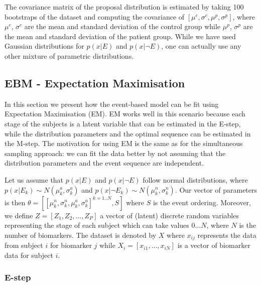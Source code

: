 The covariance matrix of the proposal distribution is estimated by taking 100 bootstraps of the dataset and computing the covariance of $[\mu^c, \sigma^c, \mu^p, \sigma^p]$, where $\mu^c$, $\sigma^c$ are the mean and standard deviation of the control group while $\mu^p$, $\sigma^p$ are the mean and standard deviation of the patient group. While we have used Gaussian distributions for $p(x|E)$ and $p(x|\neg E)$, one can actually use any other mixture of parametric distributions.


\subsection{EBM - Expectation Maximisation}
\label{sec:ebmEM}

\newcommand\independent{\protect\mathpalette{\protect\independenT}{\perp}}
\def\independenT#1#2{\mathrel{\rlap{$#1#2$}\mkern2mu{#1#2}}}

In this section we present how the event-based model can be fit using Expectation Maximisation (EM). EM works well in this scenario because each stage of the subjects is a latent variable that can be estimated in the E-step, while the distribution parameters and the optimal sequence can be estimated in the M-step. The motivation for using EM is the same as for the simultaneous sampling approach: we can fit the data better by not assuming that the distribution parameters and the event sequence are independent.

Let us assume that $p(x|E)$ and $p(x|\neg E)$ follow normal distributions, where $p(x|E_k) \sim N(\mu^a_k, \sigma^a_k)$ and $p(x|\neg E_k) \sim N(\mu^n_k, \sigma^n_k)$. Our vector of parameters is then $\theta = [[\mu_k^n, \sigma_k^n, \mu_k^a, \sigma_k^a]^{k=1..N}, S ]$ where $S$ is the event ordering. Moreover, we define $Z = [Z_1, Z_2, \dots, Z_P]$ a vector of (latent) discrete random variables representing the stage of each subject which can take values $0 \dots N$, where $N$ is the number of biomarkers. The dataset is denoted by $X$ where $x_{ij}$ represents the data from subject $i$ for biomarker $j$ while $X_i = [x_{i1}, \dots, x_{iN}]$ is a vector of biomarker data for subject $i$. 

\subsubsection{E-step}

